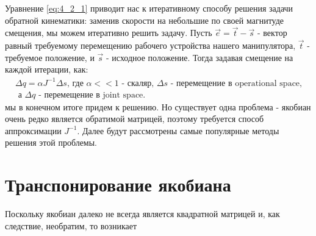 Уравнение \ref{eq:4_2_1} приводит нас к итеративному способу решения задачи обратной кинематики: заменив скорости на небольшие по своей магнитуде смещения, мы можем итеративно решить задачу. 
Пусть $\vec{e} = \vec{t} - \vec{s}$ - вектор равный требуемому перемещению рабочего устройства нашего манипулятора, $\vec{t}$ - требуемое положение, и $\vec{s}$ - исходное положение. Тогда задавая смещение на каждой итерации, как:
\begin{align}
	\Delta q = \alpha J^{-1} \Delta s  \text{, где $\alpha << 1$ - скаляр, $\Delta s$ - перемещение в operational space,}\\
	\text{ а $\Delta q$ - перемещение в joint space}.
\end{align}
мы в конечном итоге придем к решению. Но существует одна проблема - якобиан очень редко является обратимой матрицей, поэтому требуется способ аппроксимации $J^{-1}$. Далее будут рассмотрены самые популярные методы решения этой проблемы.

\section{Транспонирование якобиана}

 
Поскольку якобиан далеко не всегда является квадратной матрицей и, как следствие, необратим, то возникает  
